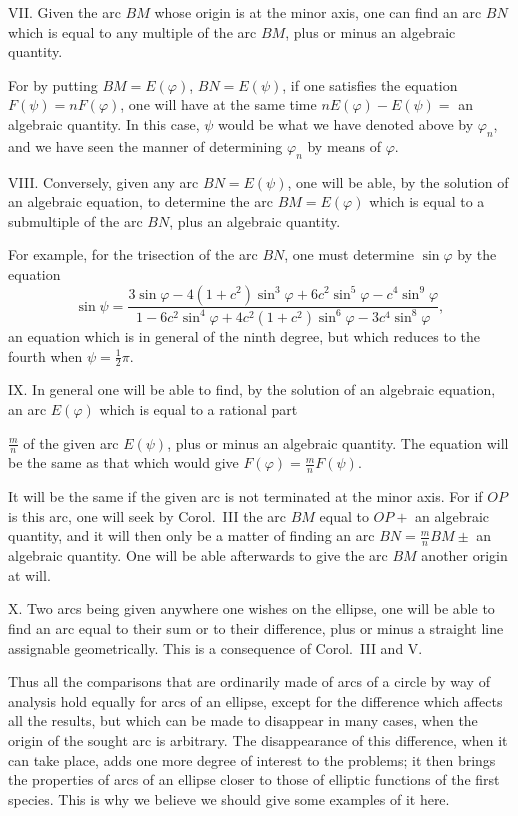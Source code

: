 \documentclass{article}
\begin{document}
VII. Given the arc $BM$ whose origin is at the minor axis, one can find an arc $BN$ which is equal to any multiple of the arc $BM$, plus or minus an algebraic quantity.

For by putting $BM=E(\varphi)$, $BN=E(\psi)$, if one satisfies the equation $F(\psi)=nF(\varphi)$, one will have at the same time $nE(\varphi)-E(\psi)=$ an algebraic quantity. In this case, $\psi$ would be what we have denoted above by $\varphi_{n}$, and we have seen the manner of determining $\varphi_{n}$ by means of $\varphi$.

VIII. Conversely, given any arc $BN=E(\psi)$, one will be able, by the solution of an algebraic equation, to determine the arc $BM=E(\varphi)$ which is equal to a submultiple of the arc $BN$, plus an algebraic quantity.

For example, for the trisection of the arc $BN$, one must determine $\sin\varphi$ by the equation
\[ \sin\psi=\frac{3\sin\varphi-4(1+c^{2})\sin^{3}\varphi+6c^{2}\sin^{5}\varphi-c^{4}\sin^{9}\varphi}{1-6c^{2}\sin^{4}\varphi+4c^{2}(1+c^{2})\sin^{6}\varphi-3c^{4}\sin^{8}\varphi}, \]
an equation which is in general of the ninth degree, but which reduces to the fourth when $\psi=\frac{1}{2}\pi$.

IX. In general one will be able to find, by the solution of an algebraic equation, an arc $E(\varphi)$ which is equal to a rational part

$\frac{m}{n}$ of the given arc $E(\psi)$, plus or minus an algebraic quantity. The equation will be the same as that which would give $F(\varphi)=\frac{m}{n}F(\psi)$.

It will be the same if the given arc is not terminated at the minor axis. For if $OP$ is this arc, one will seek by Corol.\ III the arc $BM$ equal to $OP+$ an algebraic quantity, and it will then only be a matter of finding an arc $BN=\frac{m}{n}BM\pm$ an algebraic quantity. One will be able afterwards to give the arc $BM$ another origin at will.

X. Two arcs being given anywhere one wishes on the ellipse, one will be able to find an arc equal to their sum or to their difference, plus or minus a straight line assignable geometrically. This is a consequence of Corol.\ III and V.

Thus all the comparisons that are ordinarily made of arcs of a circle by way of analysis hold equally for arcs of an ellipse, except for the difference which affects all the results, but which can be made to disappear in many cases, when the origin of the sought arc is arbitrary. The disappearance of this difference, when it can take place, adds one more degree of interest to the problems; it then brings the properties of arcs of an ellipse closer to those of elliptic functions of the first species. This is why we believe we should give some examples of it here.
\end{document}

